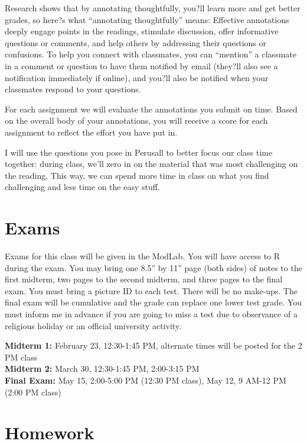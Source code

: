 \documentclass[12pt]{article}
\begin{document}
Research shows that by annotating thoughtfully, you?ll learn more and get better grades, so here?s what ``annotating thoughtfully'' means: Effective annotations deeply engage points in the readings, stimulate discussion, offer informative questions or comments, and help others by addressing their questions or confusions. To help you connect with classmates, you can ``mention'' a classmate in a comment or question to have them notified by email (they?ll also see a notification immediately if online), and you?ll also be notified when your classmates respond to your questions. 


For each assignment we will evaluate the annotations you submit on time. Based on the overall body of your annotations, you will receive a score for each assignment to reflect the effort you have put in.


I will use the questions you pose in Perusall to better focus our class time together: during class, we'll zero in on the material that was most challenging on the reading.  This way, we can spend more time in class on what you find challenging and less time on the easy stuff.


\section*{Exams}


Exams for this class will be given in the ModLab.  You will have access to R during the exam.  You may bring one 8.5'' by 11'' page (both sides) of notes to the first midterm, two pages to the second midterm, and three pages to the final exam.  You must bring a picture ID to each test.  There will be no make-ups.  The final exam will be cumulative and the grade can replace one lower test grade.  You must inform me in advance if you are going to miss a test due to observance of a religious holiday or an official university activity.


\textbf{Midterm 1:} February 23, 12:30-1:45 PM, alternate times will be posted for the 2 PM class  \\
\textbf{Midterm 2:} March 30, 12:30-1:45 PM, 2:00-3:15 PM \\
\textbf{Final Exam:} May 15, 2:00-5:00 PM (12:30 PM class), May 12, 9 AM-12 PM (2:00 PM class) \\


\section*{Homework}
\end{document}
